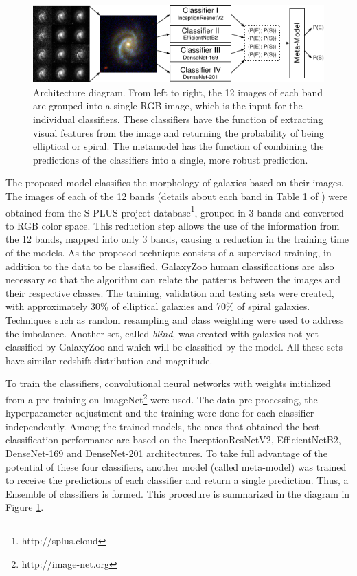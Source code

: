 \documentclass[10pt, a4paper, twocolumn]{article}
\begin{document}
\begin{figure}[!h]
  \includegraphics[width=\textwidth]{figures/arch_en.pdf}
  \caption{Architecture diagram. From left to right, the 12 images of each band are grouped into a single RGB image, which is the input for the individual classifiers. These classifiers have the function of extracting visual features from the image and returning the probability of being elliptical or spiral. The metamodel has the function of combining the predictions of the classifiers into a single, more robust prediction.}
  \label{fig:arch}
\end{figure}

The proposed model classifies the morphology of galaxies based on their images. The images of each of the 12 bands (details about each band in Table 1 of \cite{oliveira2019}) were obtained from the S-PLUS project database\footnote{http://splus.cloud}, grouped in 3 bands and converted to RGB color space. This reduction step allows the use of the information from the 12 bands, mapped into only 3 bands, causing a reduction in the training time of the models. As the proposed technique consists of a supervised training, in addition to the data to be classified, GalaxyZoo human classifications are also necessary so that the algorithm can relate the patterns between the images and their respective classes. The training, validation and testing sets were created, with approximately 30\% of elliptical galaxies and 70\% of spiral galaxies. Techniques such as random resampling and class weighting were used to address the imbalance. Another set, called \emph{blind}, was created with galaxies not yet classified by GalaxyZoo and which will be classified by the model. All these sets have similar redshift distribution and magnitude.


To train the classifiers, convolutional neural networks with weights initialized from a pre-training on ImageNet\footnote{http://image-net.org} were used. The data pre-processing, the hyperparameter adjustment and the training were done for each classifier independently. Among the trained models, the ones that obtained the best classification performance are based on the InceptionResNetV2, EfficientNetB2, DenseNet-169 and DenseNet-201 architectures. To take full advantage of the potential of these four classifiers, another model (called meta-model) was trained to receive the predictions of each classifier and return a single prediction. Thus, a Ensemble of classifiers is formed. This procedure is summarized in the diagram in Figure \ref{fig:arch}.
\end{document}
